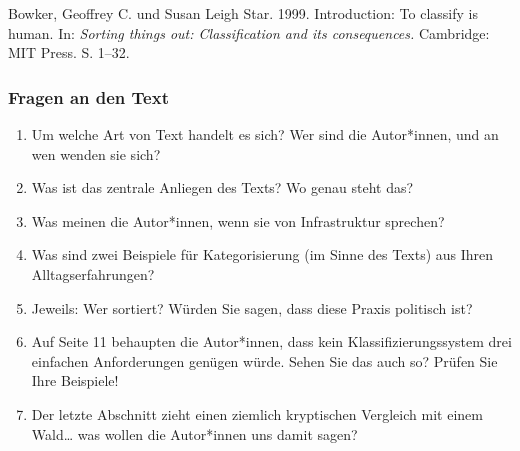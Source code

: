 \documentclass[
  ngerman,
]{article}
\providecommand{\tightlist}{%
  \setlength{\itemsep}{0pt}\setlength{\parskip}{0pt}}
\begin{document}
Bowker, Geoffrey C. und Susan Leigh Star. 1999. Introduction: To classify is human. In: \emph{Sorting things out: Classification and its consequences.} Cambridge: MIT Press. S. 1--32.

\hypertarget{fragen-an-den-text-5}{%
\subsubsection{Fragen an den Text}\label{fragen-an-den-text-5}}

\begin{enumerate}
\def\labelenumi{\arabic{enumi}.}
\tightlist
\item
  Um welche Art von Text handelt es sich? Wer sind die Autor*innen, und an wen wenden sie sich?
\item
  Was ist das zentrale Anliegen des Texts? Wo genau steht das?
\item
  Was meinen die Autor*innen, wenn sie von Infrastruktur sprechen?
\item
  Was sind zwei Beispiele für Kategorisierung (im Sinne des Texts) aus Ihren Alltagserfahrungen?
\item
  Jeweils: Wer sortiert? Würden Sie sagen, dass diese Praxis politisch ist?
\item
  Auf Seite 11 behaupten die Autor*innen, dass kein Klassifizierungssystem drei einfachen Anforderungen genügen würde. Sehen Sie das auch so? Prüfen Sie Ihre Beispiele!
\item
  Der letzte Abschnitt zieht einen ziemlich kryptischen Vergleich mit einem Wald\ldots{} was wollen die Autor*innen uns damit sagen?
\end{enumerate}
\end{document}
